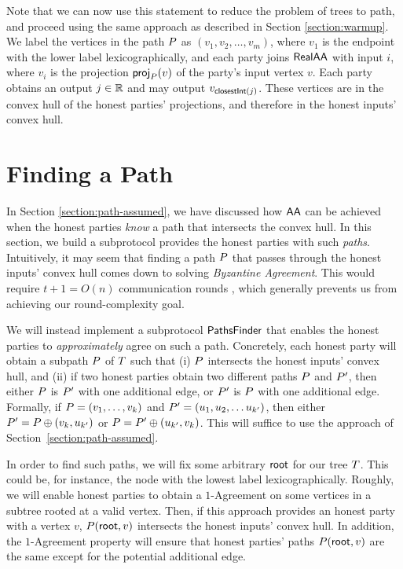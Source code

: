 Note that we can now use this statement to reduce the problem of trees to path, and proceed using the same approach as described in Section \ref{section:warmup}. We label the vertices in the path $P$  as $(v_1, v_2, \ldots, v_m)$, where $v_1$ is the endpoint with the lower label lexicographically, and each party joins $\textsf{RealAA}$ with input $i$, where $v_i$ is the projection $\textsf{proj}_{P}(v)$ of the party's input vertex $v$. Each party obtains an output $j \in \mathbb{R}$ and may output $v_{\textsf{closestInt}(j)}$. These vertices are in the convex hull of the honest parties' projections, and therefore in the honest inputs' convex hull. 


\section{Finding a Path} \label{section:path}
In Section \ref{section:path-assumed}, we have discussed how $\textsf{AA}$ can be achieved when the honest parties \emph{know} a path that intersects the convex hull. In this section, we build a subprotocol provides the honest parties with such \emph{paths}. Intuitively, it may seem that finding a path $P$ that passes through the honest inputs' convex hull comes down to solving \emph{Byzantine Agreement}. This would require $t + 1 = O(n)$ communication rounds \cite{DolStr83}, which generally prevents us from achieving our round-complexity goal.

We will instead implement a subprotocol $\textsf{PathsFinder}$ that enables the honest parties to \emph{approximately} agree on such a path. Concretely, each honest party will obtain a subpath $P$ of $T$ such that (i) $P$ intersects the honest inputs' convex hull, and (ii) if two honest parties obtain two different paths $P$ and $P'$, then either $P$ is $P'$ with one additional edge, or $P'$ is $P$ with one additional edge. 
Formally, if $P = (v_1, \ldots, v_k)$ and $P' = (u_1, u_2, \ldots u_{k'})$, then either $P' = P \oplus (v_k, u_{k'})$ or $P = P' \oplus (u_{k'}, v_k)$.
This will suffice to use the approach of Section~\ref{section:path-assumed}.

In order to find such paths, we will fix some arbitrary $\textsf{root}$ for our tree $T$. This could be, for instance, the node with the lowest label lexicographically. Roughly, we will enable honest parties to obtain a $1$-Agreement on some vertices in a subtree rooted at a 
valid vertex. Then, if this approach provides an honest party with a vertex $v$, $P(\textsf{root}, v)$ intersects the honest inputs' convex hull. In addition, the $1$-Agreement property will ensure that honest parties' paths $P(\textsf{root}, v)$ are the same except for the potential additional edge.

